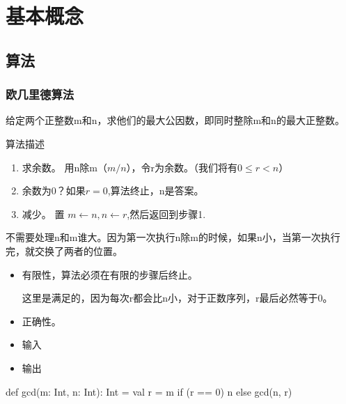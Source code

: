 \chapter{基本概念}

\section{算法}


\subsection{欧几里德算法}

给定两个正整数m和n，求他们的最大公因数，即同时整除m和n的最大正整数。

算法描述
\begin{enumerate}
\item 求余数。 用n除m（\( m / n \)），令r为余数。（我们将有\(0 \le r < n \)）
\item 余数为0？如果\( r = 0\),算法终止，n是答案。
\item 减少。 置 \( m \leftarrow n, n \leftarrow r\),然后返回到步骤1.
\end{enumerate}

不需要处理n和m谁大。因为第一次执行n除m的时候，如果n小，当第一次执行完，就交换了两者的位置。

\begin{itemize}
\item 有限性，算法必须在有限的步骤后终止。

这里是满足的，因为每次r都会比n小，对于正数序列，r最后必然等于0。

\item 正确性。

\item 输入

\item 输出                                                                                                                                                                                                                                                                                                                                                                                                                                                                         

\end{itemize}


\begin{Scala}

    def gcd(m: Int, n: Int): Int = {
      val r = m %
      if (r == 0)
        n
      else
        gcd(n, r)
    }

\end{Scala}

